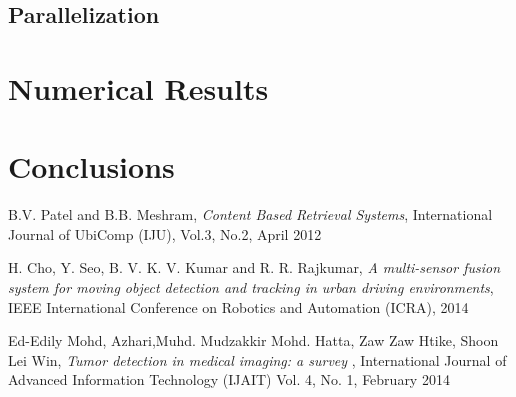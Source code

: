 \documentclass{article}
\begin{document}
{\subsection{Parallelization}

\section{Numerical Results}



\section{Conclusions}

  


\begin{thebibliography}{1}

	
B.V. Patel and B.B. Meshram,
\textit{Content Based Retrieval Systems},
International Journal of UbiComp (IJU), Vol.3, No.2, 
April 2012

H. Cho, Y. Seo, B. V. K. V. Kumar and R. R. Rajkumar, 
\textit{A multi-sensor fusion system for moving object detection and tracking in urban driving environments}, 
IEEE International Conference on Robotics and Automation (ICRA), 
2014

Ed-Edily Mohd,  Azhari,Muhd. Mudzakkir Mohd. Hatta, Zaw Zaw Htike,  Shoon Lei Win, 
\textit{Tumor detection in medical imaging: a survey }, 
International Journal of Advanced Information Technology (IJAIT) Vol. 4, No. 1, 
February 2014


\end{thebibliography}

}
\end{document}
